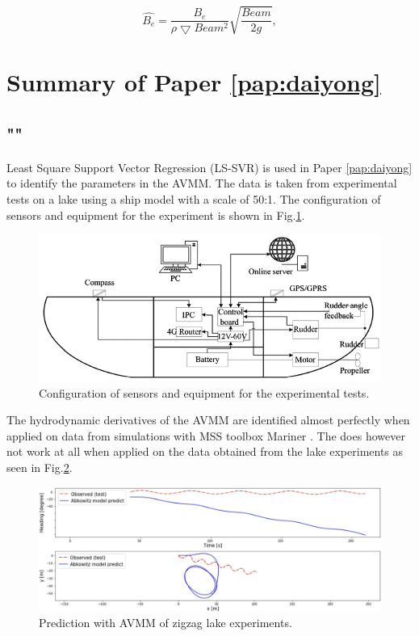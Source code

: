 

\begin{equation} \label{eq:be_eqvalent}
    \hat{B_e} = \frac{B_e}{\rho \bigtriangledown Beam^2} \sqrt{\frac{Beam}{2g}},
\end{equation}



\section{Summary of Paper \ref{pap:daiyong}}
\subsection*{""}
Least Square Support Vector Regression (LS-SVR) \cite{brereton_support_2010} is used in Paper \ref{pap:daiyong} to identify the parameters in the AVMM.  
The data is taken from experimental tests on a lake using a ship model with a scale of 50:1. The configuration of sensors and equipment for the experiment is shown in Fig.\ref{fig:cthmodel}.  
\begin{figure}[H]
    \centering
    \includegraphics[width=\textwidth]{kappa/images/cth_model.png}
    \caption{Configuration of sensors and equipment for the experimental tests.}
    \label{fig:cthmodel}
\end{figure}
\noindent The hydrodynamic derivatives of the AVMM are identified almost perfectly when applied on data from simulations with MSS toolbox Mariner \cite{tristan_matlab_2009}. The  does however not work at all when applied on the data obtained from the lake experiments as seen in Fig.\ref{fig:daiyong_extrapolation}. 

\begin{figure}[H]
    \centering
    \includegraphics[width=\linewidth]{kappa/images/daiyong_extrapolation.jpeg}
    \caption{Prediction with AVMM of zigzag lake experiments.}
    \label{fig:daiyong_extrapolation}
\end{figure}

